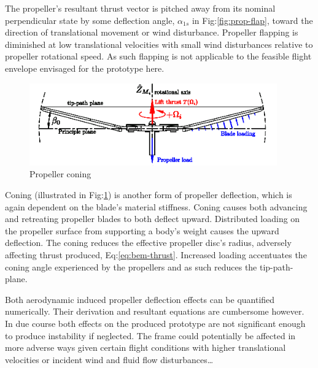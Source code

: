 \par
The propeller's resultant thrust vector is pitched away from its nominal perpendicular state by some deflection angle, $\alpha_{1s}$ in Fig:\ref{fig:prop-flap}, toward the direction of translational movement or wind disturbance. Propeller flapping is diminished at low translational velocities with small wind disturbances relative to propeller rotational speed. As such flapping is not applicable to the feasible flight envelope envisaged for the prototype here.
\par
\begin{figure}[hbtp]
\centering
\includegraphics[width=0.95\textwidth]{figs/prop-coning}
\caption{Propeller coning}
\label{fig:prop-coning}
\end{figure}
Coning (illustrated in Fig:\ref{fig:prop-coning}) is another form of propeller deflection, which is again dependent on the blade's material stiffness. Coning causes both advancing and retreating propeller blades to both deflect upward. Distributed loading on the propeller surface from supporting a body's weight causes the upward deflection. The coning reduces the effective propeller disc's radius, adversely affecting thrust produced, Eq:\ref{eq:bem-thrust}. Increased loading accentuates the coning angle experienced by the propellers and as such reduces the tip-path-plane.
\par
Both aerodynamic induced propeller deflection effects can be quantified numerically. Their derivation and resultant equations are cumbersome however. In due course both effects on the produced prototype are not significant enough to produce instability if neglected. The frame could potentially be affected in more adverse ways given certain flight conditions with higher translational velocities or incident wind and fluid flow disturbances\ldots
